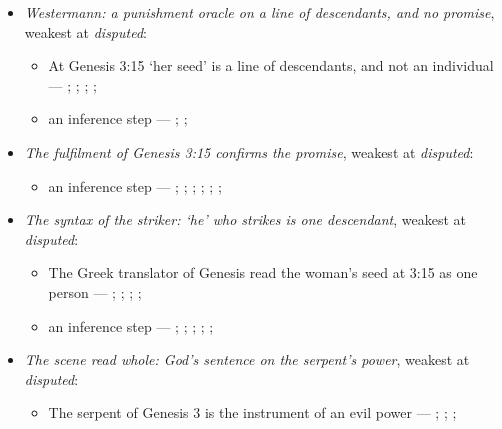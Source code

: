 \documentclass[11pt]{article}
\begin{document}
\begin{itemize}
\item \emph{Westermann: a punishment oracle on a line of descendants, and no promise}, weakest at \emph{disputed}:
\begin{itemize}
\item At Genesis 3:15 ‘her seed’ is a line of descendants, and not an individual --- \cite[259--260]{westermann-genesis-1-11-1984}; \cite[140, 147]{collins-syntactical-note-1997}; \cite[168]{leupold-exposition-genesis-1942}; \cite[363]{alexander-further-observations-1997}; \cite[32]{hamilton-skull-crushing-seed-2006}
\item an inference step --- \cite[259--261]{westermann-genesis-1-11-1984}; \cite[170--171]{calvin-commentary-genesis-1847}; \cite[102]{keil-delitzsch-pentateuch-1866}
\end{itemize}
\item \emph{The fulfilment of Genesis 3:15 confirms the promise}, weakest at \emph{disputed}:
\begin{itemize}
\item an inference step --- \cite[III.23.7]{irenaeus-against-heresies-180}; \cite[IV.40.3]{irenaeus-against-heresies-180}; \cite[42, 53]{hamilton-skull-crushing-seed-2006}; \cite[102]{keil-delitzsch-pentateuch-1866}; \cite[170]{leupold-exposition-genesis-1942}; \cite[170--171]{calvin-commentary-genesis-1847}; \cite[259--261]{westermann-genesis-1-11-1984}
\end{itemize}
\item \emph{The syntax of the striker: ‘he’ who strikes is one descendant}, weakest at \emph{disputed}:
\begin{itemize}
\item The Greek translator of Genesis read the woman’s seed at 3:15 as one person --- \cite[145]{collins-syntactical-note-1997}; \cite[144]{collins-syntactical-note-1997}; \cite{martin-earliest-messianic-1965}; \cite[300]{lewis-womans-seed-1991}; \cite[III.188]{philo-allegorical-interpretation-40}
\item an inference step --- \cite[144--146]{collins-syntactical-note-1997}; \cite[363, 364]{alexander-further-observations-1997}; \cite[166--168]{leupold-exposition-genesis-1942}; \cite[32]{hamilton-skull-crushing-seed-2006}; \cite[101]{keil-delitzsch-pentateuch-1866}; \cite[171]{calvin-commentary-genesis-1847}
\end{itemize}
\item \emph{The scene read whole: God’s sentence on the serpent’s power}, weakest at \emph{disputed}:
\begin{itemize}
\item The serpent of Genesis 3 is the instrument of an evil power --- \cite[146--147]{collins-syntactical-note-1997}; \cite[197]{woudstra-recent-translations-1971}; \cite[101--102]{keil-delitzsch-pentateuch-1866}; \cite[261]{westermann-genesis-1-11-1984}
\end{itemize}
\end{itemize}
\end{document}
